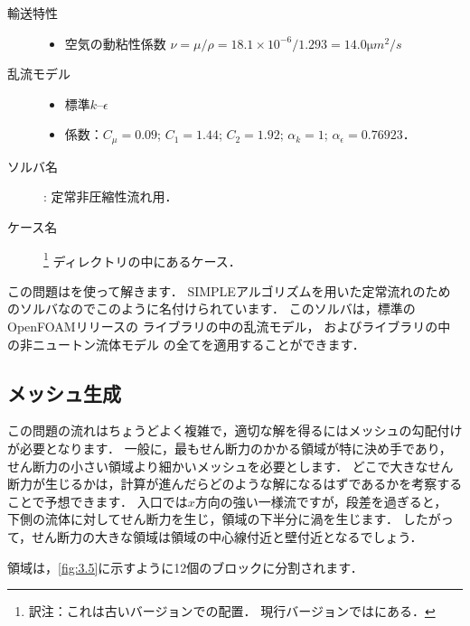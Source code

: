 \begin{description}
\begin{itemize}
            \end{itemize}
 \item[輸送特性] \mbox{}
            \begin{itemize}
             \item 空気の動粘性係数
                   $\nu = \mu/\rho = 18.1 \times 10^{-6}/1.293 = 14.0 \unit{\micro m^{2}/s}$
            \end{itemize}
 \item[乱流モデル] \mbox{}
            \begin{itemize}
             \item 標準$k$--$\epsilon$
             \item 係数：$C_{\mu} = 0.09$; $C_{1} = 1.44$; $C_{2} = 1.92$;
                   $\alpha_{k} = 1$; $\alpha_{\epsilon} = 0.76923$．
            \end{itemize}
 \item[ソルバ名] : 定常非圧縮性流れ用．
 \item[ケース名] %
\footnote{訳注：これは古いバージョンでの配置．
現行バージョンではにある．}%
            ディレクトリの中にあるケース．
\end{description}

この問題はを使って解きます．
SIMPLEアルゴリズムを用いた定常流れのためのソルバなのでこのように名付けられています．
このソルバは，標準のOpenFOAMリリースの
ライブラリの中の乱流モデル，
およびライブラリの中の非ニュートン流体モデル
の全てを適用することができます．


\subsection{メッシュ生成}
\label{ssec:3.2.2}
この問題の流れはちょうどよく複雑で，適切な解を得るにはメッシュの勾配付けが必要となります．
一般に，最もせん断力のかかる領域が特に決め手であり，せん断力の小さい領域より細かいメッシュを必要とします．
どこで大きなせん断力が生じるかは，計算が進んだらどのような解になるはずであるかを考察することで予想できます．
入口では$x$方向の強い一様流ですが，段差を過ぎると，
下側の流体に対してせん断力を生じ，領域の下半分に渦を生じます．
したがって，せん断力の大きな領域は領域の中心線付近と壁付近となるでしょう．

領域は，\autoref{fig:3.5}に示すように12個のブロックに分割されます．


